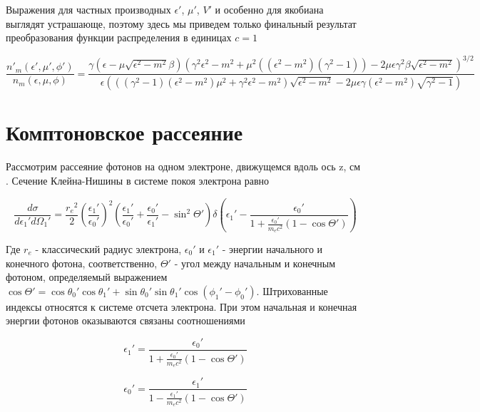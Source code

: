 Выражения для частных производных $\epsilon'$, $\mu'$, $V'$ и особенно для якобиана выглядят устрашающе, поэтому здесь мы приведем только финальный результат преобразования функции распределения в единицах $c = 1$

\begin{equation}
\frac{n'_{m}(\epsilon',\mu',\phi')}{n_{m}(\epsilon,\mu,\phi)}= \frac{\gamma(\epsilon-\mu\sqrt{{\epsilon}^2-m^2}\beta)(\gamma^2\epsilon^2-m^2 + \mu^2 ((\epsilon^2-m^2)(\gamma^2-1)) - 2\mu\epsilon\gamma^2\beta\sqrt{\epsilon^2-m^2})^{3/2}}{\epsilon(((\gamma^2-1)(\epsilon^2-m^2)\mu^2 + \gamma^2\epsilon^2 - m^2)\sqrt{\epsilon^2-m^2}-2\mu\epsilon\gamma(\epsilon^2 - m^2)\sqrt{\gamma^2 - 1})}
\end{equation}

\section{Комптоновское рассеяние}\label{ComptonFormulae}
Рассмотрим рассеяние фотонов на одном электроне, движущемся вдоль ось z, см \cite{Dubus}. Сечение Клейна-Нишины в системе покоя электрона равно

\begin{equation}\label{KleinNishina}
\frac{d\sigma}{d\epsilon_1'd\Omega_1'}=\frac{{r_e}^2}{2}\left(\frac{\epsilon_1'}{\epsilon_0'}\right)^2\left(\frac{\epsilon_1'}{\epsilon_0'}+\frac{\epsilon_0'}{\epsilon_1'}-\sin^2\Theta'\right) \delta\left(\epsilon_1' - \frac{\epsilon_0'}{1+\frac{\epsilon_0'}{m_e c^2}(1 - \cos \Theta')}\right)
\end{equation}

Где $r_e$ - классический радиус электрона, $\epsilon_0'$ и $\epsilon_1'$ - энергии начального и конечного фотона, соответственно, $\Theta'$ - угол между начальным и конечным фотоном, определяемый выражением $\cos\Theta' =\cos \theta_0' \cos \theta_1' + \sin \theta_0' \sin \theta_1' \cos(\phi_1' - \phi_0')$. Штрихованные индексы относятся к системе отсчета электрона. При этом начальная и конечная энергии фотонов оказываются связаны соотношениями

\begin{equation}
	\epsilon_1'=\frac{\epsilon_0'}{1+\frac{\epsilon_0'}{m_e c^2}(1 - \cos \Theta')}	
\end{equation}

\begin{equation}
	\epsilon_0'=\frac{\epsilon_1'}{1-\frac{\epsilon_1'}{m_e c^2}(1 - \cos \Theta')}
\end{equation}

